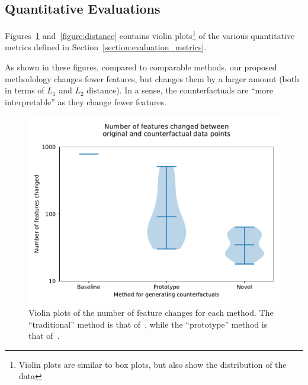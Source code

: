 \documentclass{article}
\begin{document}
\subsection{Quantitative Evaluations}
Figures~\ref{figure:feature_changes} and~\ref{figure:distance} contains violin plots\footnote{Violin plots are similar to box plots, but also show the distribution of the data} of the various quantitative metrics defined in Section~\ref{section:evaluation_metrics}.

As shown in these figures, compared to comparable methods, our proposed methodology changes fewer features, but changes them by a larger amount (both in terms of \(L_1\) and \(L_2\) distance). In a sense, the counterfactuals are ``more interpretable'' as they change fewer features.

\begin{figure}
    \centering
    \includegraphics[width=\linewidth]{figures/counterfactual_features_changed.pdf}
    \caption{Violin plots of the number of feature changes for each method. The ``traditional'' method is that of~\cite{wachter_counterfactual_2017}, while the ``prototype'' method is that of~\cite{van_looveren_conditional_2021}.\label{figure:feature_changes}}
\end{figure}
\end{document}
